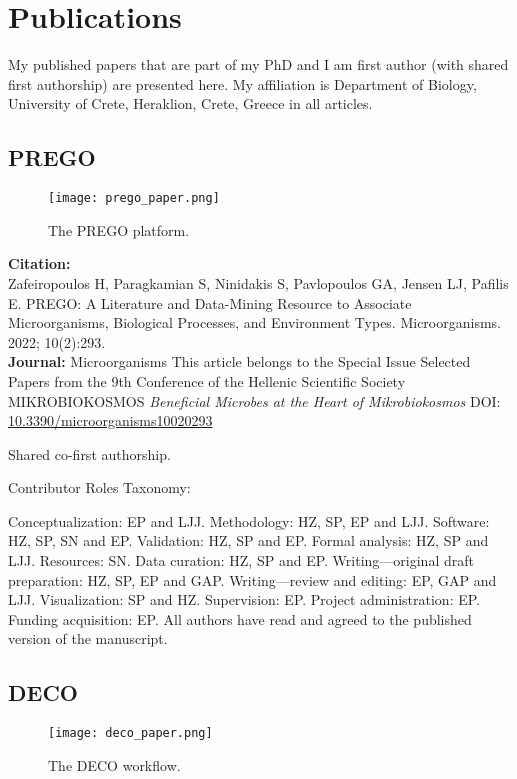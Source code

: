 \chapter{Publications}
\label{app:publications}

My published papers that are part of my PhD and I am first author (with shared first authorship) are
presented here. My affiliation is Department of Biology, University of Crete, Heraklion, Crete, Greece
in all articles. 

\section{PREGO}

\begin{figure}[hbt!] 
    \centering\texttt{[image: prego\_paper.png]}
\caption{The PREGO platform.}
    \label{fig:prego_paper}
\end{figure}

\textbf{Citation:} \\ 
Zafeiropoulos H, Paragkamian S, Ninidakis S, Pavlopoulos GA, Jensen LJ, Pafilis E.
PREGO: A Literature and Data-Mining Resource to Associate Microorganisms, Biological Processes, and Environment Types. Microorganisms. 2022; 10(2):293. \\ 
\textbf{Journal:} Microorganisms
This article belongs to the Special Issue Selected Papers from the 9th Conference of the Hellenic Scientific Society MIKROBIOKOSMOS \textit{Beneficial Microbes at the Heart of Mikrobiokosmos}
DOI: \href{https://doi.org/10.3390/microorganisms10020293}{10.3390/microorganisms10020293}

Shared co-first authorship.

Contributor Roles Taxonomy:

Conceptualization: EP and LJJ.
Methodology: HZ, SP, EP and LJJ.
Software: HZ, SP, SN and EP.
Validation: HZ, SP and EP.
Formal analysis: HZ, SP and LJJ.
Resources: SN.
Data curation: HZ, SP and EP.
Writing—original draft preparation: HZ, SP, EP and GAP.
Writing—review and editing: EP, GAP and LJJ.
Visualization: SP and HZ.
Supervision: EP.
Project administration: EP.
Funding acquisition: EP.
All authors have read and agreed to the published version of the manuscript.


\section{DECO}

\begin{figure}[hbt!] 
    \centering\texttt{[image: deco\_paper.png]}
\caption{The DECO workflow.}
    \label{fig:deco_paper}
\end{figure}

